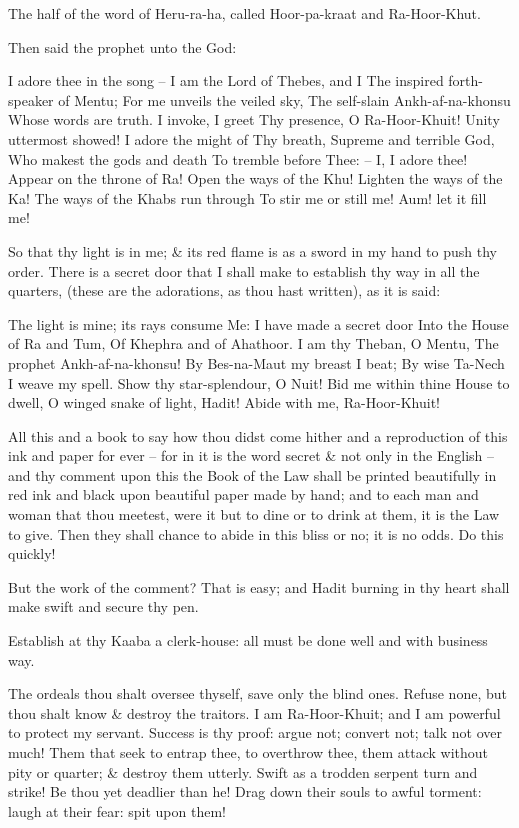 The half of the word of Heru-ra-ha, called Hoor-pa-kraat and Ra-Hoor-Khut.

Then said the prophet unto the God:

I adore thee in the song --
I am the Lord of Thebes, and I
The inspired forth-speaker of Mentu;
For me unveils the veiled sky,
The self-slain Ankh-af-na-khonsu
Whose words are truth. I invoke, I greet
Thy presence, O Ra-Hoor-Khuit!
Unity uttermost showed!
I adore the might of Thy breath,
Supreme and terrible God,
Who makest the gods and death
To tremble before Thee: --
I, I adore thee!
Appear on the throne of Ra!
Open the ways of the Khu!
Lighten the ways of the Ka!
The ways of the Khabs run through
To stir me or still me!
Aum! let it fill me!

So that thy light is in me; \& its red flame is as a sword in my hand to push thy order. There is a secret door that I shall make to establish thy way in all the quarters, (these are the adorations, as thou hast written), as it is said:\par
The light is mine; its rays consume
Me: I have made a secret door
Into the House of Ra and Tum,
Of Khephra and of Ahathoor.
I am thy Theban, O Mentu,
The prophet Ankh-af-na-khonsu!
By Bes-na-Maut my breast I beat;
By wise Ta-Nech I weave my spell.
Show thy star-splendour, O Nuit!
Bid me within thine House to dwell,
O winged snake of light, Hadit!
Abide with me, Ra-Hoor-Khuit!

All this and a book to say how thou didst come hither and a reproduction of this ink and paper for ever -- for in it is the word secret \& not only in the English -- and thy comment upon this the Book of the Law shall be printed beautifully in red ink and black upon beautiful paper made by hand; and to each man and woman that thou meetest, were it but to dine or to drink at them, it is the Law to give. Then they shall chance to abide in this bliss or no; it is no odds. Do this quickly!

But the work of the comment? That is easy; and Hadit burning in thy heart shall make swift and secure thy pen.

Establish at thy Kaaba a clerk-house: all must be done well and with business way.

The ordeals thou shalt oversee thyself, save only the blind ones. Refuse none, but thou shalt know \& destroy the traitors. I am Ra-Hoor-Khuit; and I am powerful to protect my servant. Success is thy proof: argue not; convert not; talk not over much! Them that seek to entrap thee, to overthrow thee, them attack without pity or quarter; \& destroy them utterly. Swift as a trodden serpent turn and strike! Be thou yet deadlier than he! Drag down their souls to awful torment: laugh at their fear: spit upon them!

